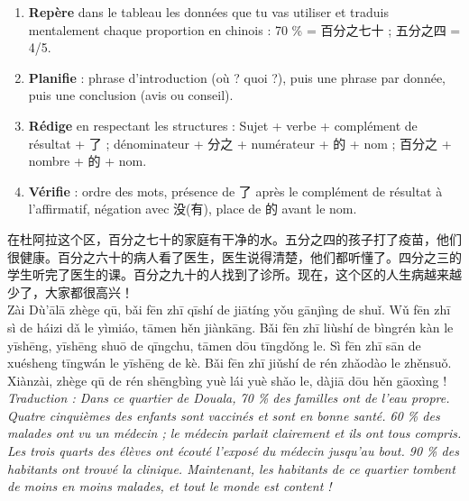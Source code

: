 \documentclass[11pt]{article}
\begin{document}
\begin{methode}
\begin{enumerate}
\item \textbf{Repère} dans le tableau les données que tu vas utiliser et traduis mentalement chaque proportion en chinois : 70 \% = 百分之七十 ; 五分之四 = 4/5.
\item \textbf{Planifie} : phrase d'introduction (où ? quoi ?), puis une phrase par donnée, puis une conclusion (avis ou conseil).
\item \textbf{Rédige} en respectant les structures : Sujet + verbe + complément de résultat + 了 ; dénominateur + 分之 + numérateur + 的 + nom ; 百分之 + nombre + 的 + nom.
\item \textbf{Vérifie} : ordre des mots, présence de 了 après le complément de résultat à l'affirmatif, négation avec 没(有), place de 的 avant le nom.
\end{enumerate}
\end{methode}

\begin{exemplebox}
在杜阿拉这个区，百分之七十的家庭有干净的水。五分之四的孩子打了疫苗，他们很健康。百分之六十的病人看了医生，医生说得清楚，他们都听懂了。四分之三的学生听完了医生的课。百分之九十的人找到了诊所。现在，这个区的人生病越来越少了，大家都很高兴！\\[4pt]
Zài Dù'ālā zhège qū, bǎi fēn zhī qīshí de jiātíng yǒu gānjìng de shuǐ. Wǔ fēn zhī sì de háizi dǎ le yìmiáo, tāmen hěn jiànkāng. Bǎi fēn zhī liùshí de bìngrén kàn le yīshēng, yīshēng shuō de qīngchu, tāmen dōu tīngdǒng le. Sì fēn zhī sān de xuésheng tīngwán le yīshēng de kè. Bǎi fēn zhī jiǔshí de rén zhǎodào le zhěnsuǒ. Xiànzài, zhège qū de rén shēngbìng yuè lái yuè shǎo le, dàjiā dōu hěn gāoxìng !\\[4pt]
\emph{Traduction : Dans ce quartier de Douala, 70 \% des familles ont de l'eau propre. Quatre cinquièmes des enfants sont vaccinés et sont en bonne santé. 60 \% des malades ont vu un médecin ; le médecin parlait clairement et ils ont tous compris. Les trois quarts des élèves ont écouté l'exposé du médecin jusqu'au bout. 90 \% des habitants ont trouvé la clinique. Maintenant, les habitants de ce quartier tombent de moins en moins malades, et tout le monde est content !}
\end{exemplebox}
\end{document}
